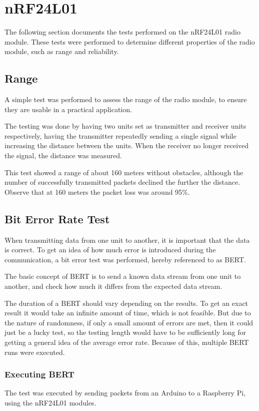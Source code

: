 \section{nRF24L01}
The following section documents the tests performed on the nRF24L01 radio module. These tests were performed to determine different properties of the radio module, such as range and reliability.

\subsection{Range}
A simple test was performed to assess the range of the radio module, to ensure they are usable in a practical application. 

The testing was done by having two units set as transmitter and receiver units respectively, having the transmitter repeatedly sending a single signal while increasing the distance between the units. When the receiver no longer received the signal, the distance was measured.

This test showed a range of about 160 meters without obstacles, although the number of successfully transmitted packets declined the further the distance. Observe that at 160 meters the packet loss was around 95\%.

\subsection{Bit Error Rate Test}
When transmitting data from one unit to another, it is important that the data is correct. To get an idea of how much error is introduced during the communication, a bit error test was performed, hereby referenced to as BERT.

The basic concept of BERT is to send a known data stream from one unit to another, and check how much it differs from the expected data stream.

The duration of a BERT should vary depending on the results. To get an exact result it would take an infinite amount of time, which is not feasible. But due to the nature of randomness, if only a small amount of errors are met, then it could just be a lucky test, so the testing length would have to be sufficiently long for getting a general idea of the average error rate. Because of this, multiple BERT runs were executed.

\subsubsection*{Executing BERT} 
The test was executed by sending packets from an Arduino to a Raspberry Pi, using the nRF24L01 modules.


